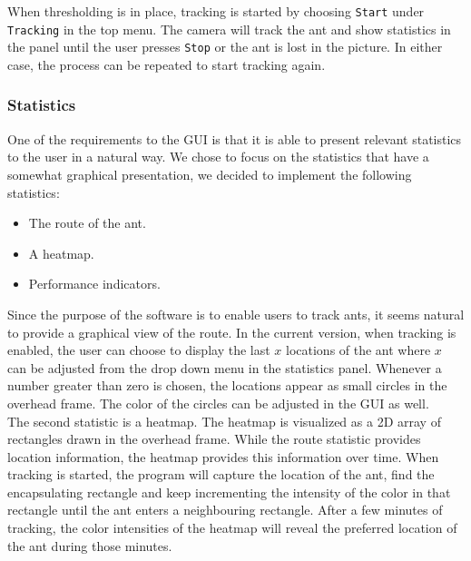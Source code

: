 When thresholding is in place, tracking is started by choosing \texttt{Start} under \texttt{Tracking} in the top menu. The camera will track the ant and show statistics in the panel until the user presses \texttt{Stop} or the ant is lost in the picture. In either case, the process can be repeated to start tracking again.



\newpage
\subsubsection{Statistics} \mbox{}\par
One of the requirements to the GUI is that it is able to present relevant statistics to the user in a natural way. We chose to focus on the statistics that have a somewhat graphical presentation, we decided to implement the following statistics:

\begin{itemize}
  \item{The route of the ant.}
  \item{A heatmap.}
  \item{Performance indicators.}
\end{itemize}

Since the purpose of the software is to enable users to track ants, it seems natural to provide a graphical view of the route. In the current version, when tracking is enabled, the user can choose to display the last $x$ locations of the ant where $x$ can be adjusted from the drop down menu in the statistics panel. Whenever a number greater than zero is chosen, the locations appear as small circles in the overhead frame.
The color of the circles can be adjusted in the GUI as well. \\	

The second statistic is a heatmap. The heatmap is visualized as a 2D array of rectangles drawn in the overhead frame. While the route statistic provides location information, the heatmap provides this information over time. When tracking is started, the program will capture the location of the ant, find the encapsulating rectangle and keep incrementing the intensity of the color in that rectangle until the ant enters a neighbouring rectangle. After a few minutes of tracking, the color intensities of the heatmap will reveal the preferred location of the ant during those minutes. \\

